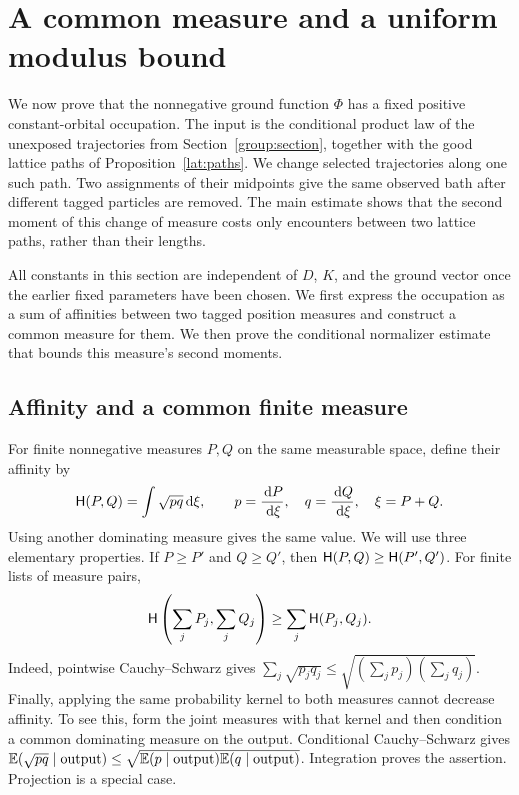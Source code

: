 \section{A common measure and a uniform modulus bound}
\label{cmp:section}

We now prove that the nonnegative ground function $\Phi$ has a fixed positive
constant-orbital occupation. The input is the conditional product law of the
unexposed trajectories from Section~\ref{group:section}, together with the good
lattice paths of Proposition~\ref{lat:paths}. We change selected trajectories
along one such path. Two assignments of their midpoints give the same observed
bath after different tagged particles are removed. The main estimate shows
that the second moment of this change of measure costs only encounters between
two lattice paths, rather than their lengths.

All constants in this section are independent of $D$, $K$, and the ground
vector once the earlier fixed parameters have been chosen. We first express
the occupation as a sum of affinities between two tagged position measures
and construct a common measure for them. We then prove the conditional
normalizer estimate that bounds this measure's second moments.

\subsection{Affinity and a common finite measure}

For finite nonnegative measures $P,Q$ on the same measurable space, define
their affinity by
\[
 \mathsf H(P,Q)=\int\sqrt{pq}\,\mathrm d\xi,
 \qquad p=\frac{\,\mathrm d P}{\,\mathrm d\xi},\quad q=\frac{\,\mathrm d Q}{\,\mathrm d\xi},
 \quad \xi=P+Q.
\]
Using another dominating measure gives the same value. We will use three
elementary properties. If $P\ge P'$ and $Q\ge Q'$, then
$\mathsf H(P,Q)\ge\mathsf H(P',Q')$. For finite lists of measure pairs,
\begin{equation}\label{cmp:affinity-superadditive}
 \mathsf H\left(\sum_jP_j,\sum_jQ_j\right)
 \ge\sum_j\mathsf H(P_j,Q_j).
\end{equation}
Indeed, pointwise Cauchy--Schwarz gives
$\sum_j\sqrt{p_jq_j}\le\sqrt{(\sum_jp_j)(\sum_jq_j)}$.
Finally, applying the same probability kernel to both measures cannot decrease
affinity. To see this, form the joint measures with that kernel and then
condition a common dominating measure on the output. Conditional
Cauchy--Schwarz gives
$\mathbb E(\sqrt{pq}\mid\text{output})\le
\sqrt{\mathbb E(p\mid\text{output})\mathbb E(q\mid\text{output})}$.
Integration proves the assertion. Projection is a special case.

